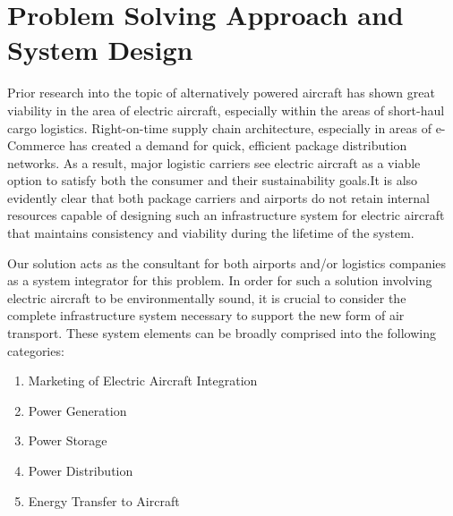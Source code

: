 \documentclass[../main.tex]{subfiles}
\begin{document}
\section{Problem Solving Approach and System Design}\label{finalDesign}

Prior research into the topic of alternatively powered aircraft has shown great viability in the area of electric aircraft, especially within the areas of short-haul cargo logistics. Right-on-time supply chain architecture, especially in areas of e-Commerce has created a demand for quick, efficient package distribution networks. As a result, major logistic carriers see electric aircraft as a viable option to satisfy both the consumer and their sustainability goals.It is also evidently clear that both package carriers and airports do not retain internal resources capable of designing such an infrastructure system for electric aircraft that maintains consistency and viability during the lifetime of the system.\par
Our solution acts as the consultant for both airports and/or logistics companies as a system integrator for this problem. In order for such a solution involving electric aircraft to be environmentally sound, it is crucial to consider the complete infrastructure system necessary to support the new form of air transport. These system elements can be broadly comprised into the following categories:
\begin{singlespace}
\begin{enumerate}
    \item Marketing of Electric Aircraft Integration
    \item Power Generation
    \item Power Storage
    \item Power Distribution
    \item Energy Transfer to Aircraft
\end{enumerate}
\end{singlespace}
\end{document}
